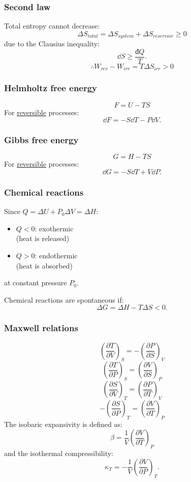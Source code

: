 \documentclass{article}
\newcommand{\idd}{\text{đ}}
\begin{document}
\begin{multicols*}{3}
\subsubsection*{Second law}
Total entropy cannot decrease:
$$\Delta S_{total}=\Delta S_{system}
+\Delta S_{reservoir}\geq0$$
due to the Clausius inequality:
$$\dd S\geq\frac{\idd Q}{T}.$$
$$\therefore W_{rev}-W_{irr}
=T\Delta S_{irr}>0$$

\subsubsection*{Helmholtz free energy}
$$F=U-TS$$
For \underline{reversible} processes:
$$\dd F=-S\dd T-P\dd V.$$

\subsubsection*{Gibbs free energy}
$$G=H-TS$$
For \underline{reversible} processes:
$$\dd G=-S\dd T+V\dd P.$$

\subsubsection*{Chemical reactions}
Since
$Q=\Delta U+P_0\Delta V=\Delta H$:
\begin{itemize}
    \item $Q<0$: exothermic \\
    (heat is released)
    \item $Q>0$: endothermic \\
    (heat is absorbed)
\end{itemize}
at constant pressure $P_0$.

Chemical reactions are spontaneous if:
$$\Delta G=\Delta H-T\Delta S<0.$$

\subsubsection*{Maxwell relations}
$$\left(\frac{\partial T}{\partial V}\right)_S
=-\left(\frac{\partial P}{\partial S}\right)_V$$
$$\left(\frac{\partial T}{\partial P}\right)_S
=\left(\frac{\partial V}{\partial S}\right)_P$$
$$\left(\frac{\partial S}{\partial V}\right)_T
=\left(\frac{\partial P}{\partial T}\right)_V$$
$$-\left(\frac{\partial S}{\partial P}\right)_T
=\left(\frac{\partial V}{\partial T}\right)_P$$
The isobaric expansivity is defined as:
$$\beta=\frac{1}{V}
\left(\frac{\partial V}{\partial T}\right)_P$$
and the isothermal compressibility:
$$\kappa_T=-\frac{1}{V}
\left(\frac{\partial V}{\partial P}\right)_T.$$


\end{multicols*}
\end{document}

